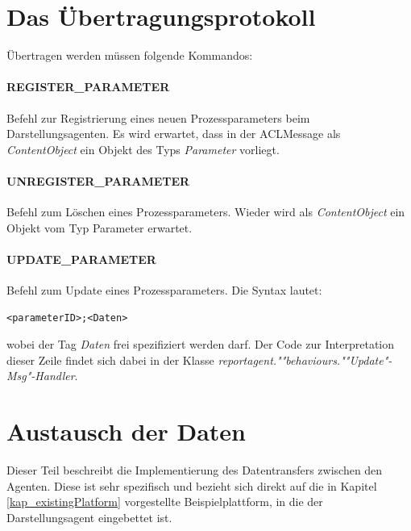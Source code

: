 \documentclass[a4paper,12pt,oneside,openright,onecolumn,final,titlepage,fleqn,ngerman]{scrreprt}
\newcommand{\repag}{Darstellungsagent}
\begin{document}
	\section{Das Übertragungsprotokoll}\label{kap_protocol}
	Übertragen werden müssen folgende Kommandos:

	\paragraph{REGISTER\_PARAMETER}
	Befehl zur Registrierung eines neuen Prozessparameters beim \repag{}en. Es wird erwartet, dass in der ACLMessage als \emph{ContentObject} ein Objekt des Typs \emph{Parameter} vorliegt.

	\paragraph{UNREGISTER\_PARAMETER}
	Befehl zum Löschen eines Prozessparameters. Wieder wird als \emph{ContentObject} ein Objekt vom Typ Parameter erwartet.

	\paragraph{UPDATE\_PARAMETER}\label{kap_UpdateMsg}
	Befehl zum Update eines Prozessparameters. Die Syntax lautet:

	\begin{lstlisting}[caption={Syntax UPDATE\_PARAMETER},label={lst_syntax_datentag}]
		<parameterID>;<Daten>
	\end{lstlisting}

	wobei der Tag \textit{Daten} frei spezifiziert werden darf. Der Code zur Interpretation dieser Zeile findet sich dabei in der Klasse \emph{reportagent.""behaviours.""Update"-Msg"-Handler}.

	\section{Austausch der Daten}\label{kap_dataman_austausch}
	Dieser Teil beschreibt die Implementierung des Datentransfers zwischen den Agenten. Diese ist sehr spezifisch und bezieht sich direkt auf die in Kapitel \ref{kap_existingPlatform} vorgestellte Beispielplattform, in die der \repag{} eingebettet ist.
	
\end{document}
